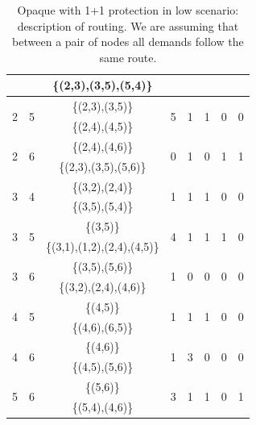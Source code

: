 \begin{table}[h!]
\begin{tabular}{|| c | c | c | c | c | c | c | c ||}
 & & \{(2,3),(3,5),(5,4)\} & & & & &\\ \hline
 \multirow{2}{*}{2} & \multirow{2}{*}{5} & \{(2,3),(3,5)\} & \multirow{2}{*}{5} & \multirow{2}{*}{1} & \multirow{2}{*}{1} & \multirow{2}{*}{0} & \multirow{2}{*}{0}\\
 & & \{(2,4),(4,5)\} & & & & &\\ \hline
 \multirow{2}{*}{2} & \multirow{2}{*}{6} & \{(2,4),(4,6)\} & \multirow{2}{*}{0} & \multirow{2}{*}{1} & \multirow{2}{*}{0} & \multirow{2}{*}{1} & \multirow{2}{*}{1}\\
 & & \{(2,3),(3,5),(5,6)\} & & & & &\\ \hline
 \multirow{2}{*}{3} & \multirow{2}{*}{4} & \{(3,2),(2,4)\} & \multirow{2}{*}{1} & \multirow{2}{*}{1} & \multirow{2}{*}{1} & \multirow{2}{*}{0} & \multirow{2}{*}{0}\\
 & & \{(3,5),(5,4)\} & & & & &\\ \hline
 \multirow{2}{*}{3} & \multirow{2}{*}{5} & \{(3,5)\} & \multirow{2}{*}{4} & \multirow{2}{*}{1} & \multirow{2}{*}{1} & \multirow{2}{*}{1} & \multirow{2}{*}{0}\\
 & & \{(3,1),(1,2),(2,4),(4,5)\} & & & & &\\ \hline
 \multirow{2}{*}{3} & \multirow{2}{*}{6} & \{(3,5),(5,6)\} & \multirow{2}{*}{1} & \multirow{2}{*}{0} & \multirow{2}{*}{0} & \multirow{2}{*}{0} & \multirow{2}{*}{0}\\
 & & \{(3,2),(2,4),(4,6)\} & & & & &\\ \hline
 \multirow{2}{*}{4} & \multirow{2}{*}{5} & \{(4,5)\} & \multirow{2}{*}{1} & \multirow{2}{*}{1} & \multirow{2}{*}{1} & \multirow{2}{*}{0} & \multirow{2}{*}{0}\\
 & & \{(4,6),(6,5)\} & & & & &\\ \hline
 \multirow{2}{*}{4} & \multirow{2}{*}{6} & \{(4,6)\} & \multirow{2}{*}{1} & \multirow{2}{*}{3} & \multirow{2}{*}{0} & \multirow{2}{*}{0} & \multirow{2}{*}{0}\\
 & & \{(4,5),(5,6)\} & & & & &\\ \hline
 \multirow{2}{*}{5} & \multirow{2}{*}{6} & \{(5,6)\} & \multirow{2}{*}{3} & \multirow{2}{*}{1} & \multirow{2}{*}{1} & \multirow{2}{*}{0} & \multirow{2}{*}{1}\\
 & & \{(5,4),(4,6)\} & & & & &\\
 \hline
\end{tabular}
\caption{Opaque with 1+1 protection in low scenario: description of routing. We are assuming that between a pair of nodes all demands follow the same route.}
\label{path_opaque_protec_ref_low}
\end{table}

